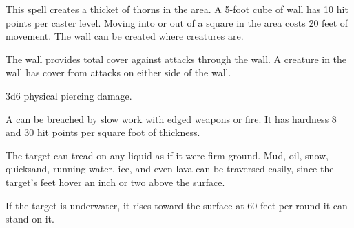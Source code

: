 \begin{spellheader}
\end{spellheader}
\begin{spellcontent}
    \begin{spelltargetinginfo}
    \end{spelltargetinginfo}
    \begin{spelleffects}
        \spelleffect This spell creates a thicket of thorns in the area. A 5-foot cube of wall has 10 hit points per caster level. Moving into or out of a square in the area costs 20 feet of movement. The wall can be created where creatures are.

        The wall provides total cover against attacks through the wall. A creature in the wall has cover from attacks on either side of the wall.
        \spelldur{\durlong \dismissable}
    \end{spelleffects}
\end{spellcontent}
\begin{spellsubcontent}
    \begin{spelltargetinginfo}
    \end{spelltargetinginfo}
    \begin{spelleffects}
        \spelleffect 3d6 physical piercing damage.
    \end{spelleffects}
\end{spellsubcontent}
\begin{spellfooter}
    \spellnotes A  can be breached by slow work with edged weapons or fire. It has hardness 8 and 30 hit points per square foot of thickness.
\end{spellfooter}

\begin{spellheader}
    \begin{spelltargetinginfo}
    \end{spelltargetinginfo}
\end{spellheader}
\begin{spellcontent}
    \begin{spelleffects}
        \spelleffect The target can tread on any liquid as if it were firm ground. Mud, oil, snow, quicksand, running water, ice, and even lava can be traversed easily, since the target's feet hover an inch or two above the surface.
        \par If the target is underwater, it rises toward the surface at 60 feet per round it can stand on it.
        \spelldur{\durlong \dismissable}
    \end{spelleffects}
\end{spellcontent}
\begin{spellfooter}

\end{spellfooter}

